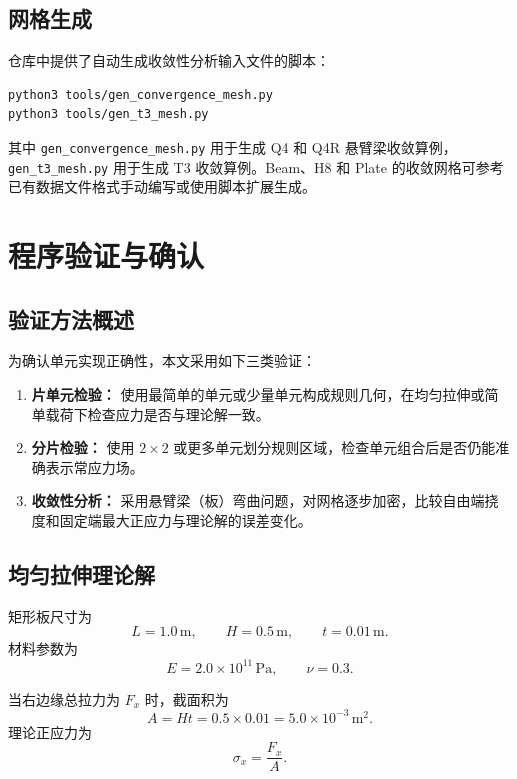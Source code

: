 \documentclass[UTF8,a4paper,zihao=-4]{ctexart}
\begin{document}
\subsection{网格生成}

仓库中提供了自动生成收敛性分析输入文件的脚本：
\begin{lstlisting}[language=bash,caption={生成收敛性分析网格}]
python3 tools/gen_convergence_mesh.py
python3 tools/gen_t3_mesh.py
\end{lstlisting}

其中 \texttt{gen\_convergence\_mesh.py} 用于生成 Q4 和 Q4R 悬臂梁收敛算例，\texttt{gen\_t3\_mesh.py} 用于生成 T3 收敛算例。Beam、H8 和 Plate 的收敛网格可参考已有数据文件格式手动编写或使用脚本扩展生成。

\section{程序验证与确认}

\subsection{验证方法概述}

为确认单元实现正确性，本文采用如下三类验证：

\begin{enumerate}
    \item \textbf{片单元检验：}
    使用最简单的单元或少量单元构成规则几何，在均匀拉伸或简单载荷下检查应力是否与理论解一致。

    \item \textbf{分片检验：}
    使用 $2\times2$ 或更多单元划分规则区域，检查单元组合后是否仍能准确表示常应力场。

    \item \textbf{收敛性分析：}
    采用悬臂梁（板）弯曲问题，对网格逐步加密，比较自由端挠度和固定端最大正应力与理论解的误差变化。
\end{enumerate}

\subsection{均匀拉伸理论解}

矩形板尺寸为
\[
    L=1.0\,\mathrm{m},\qquad
    H=0.5\,\mathrm{m},\qquad
    t=0.01\,\mathrm{m}.
\]
材料参数为
\[
    E=2.0\times 10^{11}\,\mathrm{Pa},\qquad
    \nu=0.3.
\]

当右边缘总拉力为 $F_x$ 时，截面积为
\[
    A=Ht=0.5\times0.01=5.0\times10^{-3}\,\mathrm{m^2}.
\]
理论正应力为
\begin{equation}
    \sigma_x=\frac{F_x}{A}.
\end{equation}
\end{document}
